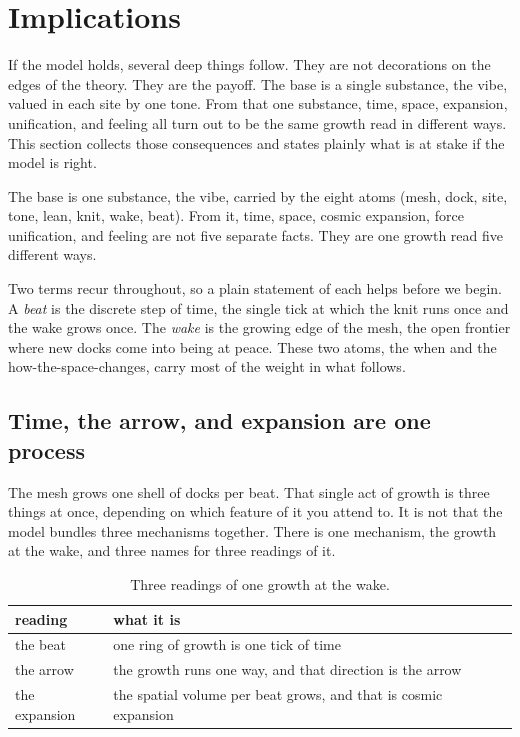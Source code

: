 \section{Implications}

If the model holds, several deep things follow. They are not decorations on the edges of the theory. They are the payoff. The base is a single substance, the vibe, valued in each site by one tone. From that one substance, time, space, expansion, unification, and feeling all turn out to be the same growth read in different ways. This section collects those consequences and states plainly what is at stake if the model is right.

\begin{principle}
The base is one substance, the vibe, carried by the eight atoms (mesh, dock, site, tone, lean, knit, wake, beat). From it, time, space, cosmic expansion, force unification, and feeling are not five separate facts. They are one growth read five different ways.
\end{principle}

Two terms recur throughout, so a plain statement of each helps before we begin. A \emph{beat} is the discrete step of time, the single tick at which the knit runs once and the wake grows once. The \emph{wake} is the growing edge of the mesh, the open frontier where new docks come into being at peace. These two atoms, the when and the how-the-space-changes, carry most of the weight in what follows.

\subsection{Time, the arrow, and expansion are one process}

The mesh grows one shell of docks per beat. That single act of growth is three things at once, depending on which feature of it you attend to. It is not that the model bundles three mechanisms together. There is one mechanism, the growth at the wake, and three names for three readings of it.

\begin{table}[ht]
\centering
\begin{tabular}{@{}ll@{}}
\toprule
reading & what it is \\
\midrule
the beat & one ring of growth is one tick of time \\
the arrow & the growth runs one way, and that direction is the arrow \\
the expansion & the spatial volume per beat grows, and that is cosmic expansion \\
\bottomrule
\end{tabular}
\caption{Three readings of one growth at the wake.}
\label{tab:growth-readings}
\end{table}

